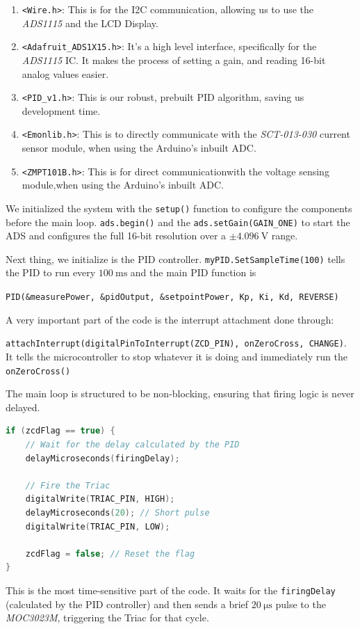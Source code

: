 \documentclass[11pt]{article}
\begin{document}
\begin{enumerate}
	\item \verb|<Wire.h>|: This is for the I2C communication, allowing us to use the \emph{ADS1115} and the LCD Display.

	\item \verb|<Adafruit_ADS1X15.h>|: It's a high level interface, specifically for the \emph{ADS1115} IC. It makes the process of setting a gain, and reading 16-bit analog values easier.

	\item \verb|<PID_v1.h>|: This is our robust, prebuilt PID algorithm, saving us development time.

	\item \verb|<Emonlib.h>|: This is to directly communicate with the \emph{SCT-013-030} current sensor module, when using the Arduino's inbuilt ADC.

	\item \verb|<ZMPT101B.h>|: This is for direct communicationwith the voltage sensing module,when using the Arduino's inbuilt ADC.
\end{enumerate}

We initialized the system with the \verb|setup()| function to configure the components before the main loop. \verb|ads.begin()| and the \verb|ads.setGain(GAIN_ONE)| to start the ADS and configures the full 16-bit resolution over a $\pm \SI{4.096}{\volt}$ range.

\noindent Next thing, we initialize is the PID controller. \verb|myPID.SetSampleTime(100)| tells the PID to run every $\SI{100}{\milli\second}$ and the main PID function is 

\noindent \verb|PID(&measurePower, &pidOutput, &setpointPower, Kp, Ki, Kd, REVERSE)|

A very important part of the code is the interrupt attachment done through: 

\noindent \verb|attachInterrupt(digitalPinToInterrupt(ZCD_PIN), onZeroCross, CHANGE)|. 
It tells the microcontroller to stop whatever it is doing and immediately run the \verb|onZeroCross()|

\noindent The main loop is structured to be non-blocking, ensuring that firing logic is never delayed.
\begin{lstlisting}[language=C++]
if (zcdFlag == true) {
	// Wait for the delay calculated by the PID
	delayMicroseconds(firingDelay);

	// Fire the Triac
	digitalWrite(TRIAC_PIN, HIGH);
	delayMicroseconds(20); // Short pulse
	digitalWrite(TRIAC_PIN, LOW);
	   
	zcdFlag = false; // Reset the flag
}
\end{lstlisting}
\noindent This is the most time-sensitive part of the code. It waits for the \verb|firingDelay| (calculated by the PID controller) and then sends a brief $\SI{20}{\micro\second}$ pulse to the \emph{MOC3023M}, triggering the Triac for that cycle.
\end{document}
